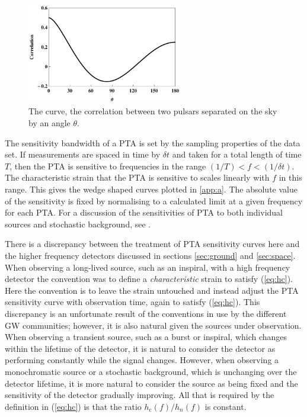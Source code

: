 \begin{figure}
 \centering
 \includegraphics[trim=0cm 0cm 0cm 0cm, width=0.6\textwidth]{HnDcurve.pdf}
 \caption{The \citet{HellingsDowns} curve, the correlation between two pulsars separated on the sky by an angle $\theta$.}
 \label{fig:HnD}
\end{figure}

The sensitivity bandwidth of a PTA is set by the sampling properties of the data set. If measurements are spaced in time by $\delta t$ and taken for a total length of time $T$, then the PTA is sensitive to frequencies in the range $(1/T) < f < (1/\delta t)$. The characteristic strain that the PTA is sensitive to scales linearly with $f$ in this range. This gives the wedge shaped curves plotted in \ref{app:a}. The absolute value of the sensitivity is fixed by normalising to a calculated limit at a given frequency for each PTA. For a discussion of the sensitivities of PTA to both individual sources and stochastic background, see \citet{MooreTaylorGair}.

There is a discrepancy between the treatment of PTA sensitivity curves here and the higher frequency detectors discussed in sections \ref{sec:ground} and \ref{sec:space}. When observing a long-lived source, such as an inspiral, with a high frequency detector the convention was to define a \emph{characteristic} strain to satisfy (\ref{eq:hc}). Here the convention is to leave the strain untouched and instead adjust the PTA sensitivity curve with observation time, again to satisfy (\ref{eq:hc}). This discrepancy is an unfortunate result of the conventions in use by the different GW communities; however, it is also natural given the sources under observation. When observing a transient source, such as a burst or inspiral, which changes within the lifetime of the detector, it is natural to consider the detector as performing constantly while the signal changes. However, when observing a monochromatic source or a stochastic background, which is unchanging over the detector lifetime, it is more natural to consider the source as being fixed and the sensitivity of the detector gradually improving. All that is required by the definition in (\ref{eq:hc}) is that the ratio $h_\mathrm{c}(f)/h_{n}(f)$ is constant.


